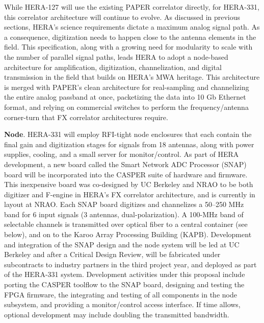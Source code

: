 \documentclass[preprint]{aastex}
\begin{document}
While HERA-127 will use the existing PAPER correlator directly, for
HERA-331, this correlator architecture will continue to evolve.  As discussed in previous sections,
HERA's science requirements dictate a maximum analog signal path.  As a consequence,
digitization needs to happen close to the antenna
elements in the field.  This specification, along with a growing need for modularity to scale with the number of parallel signal paths,
leads HERA to adopt a node-based architecture for amplification, digitization, channelization, and digital
transmission in the field that builds on HERA's MWA heritage.  This architecture is merged with PAPER's clean 
architecture for real-sampling and channelizing the entire analog passband at once, packetizing the data into
10 Gb Ethernet format, and relying on commercial switches to perform the frequency/antenna corner-turn that
FX correlator architectures require. 



\noindent
{\bf Node}. HERA-331 will employ RFI-tight node enclosures that each contain the final gain and digitization stages for
signals from 18 antennas, along with power supplies, cooling, and a small server for monitor/control.  
As part of HERA development,
a new board called the Smart Network ADC Processor (SNAP) board will be incorporated 
into the CASPER suite of hardware and firmware. This inexpensive board was co-designed by UC Berkeley and NRAO to be
both digitizer and F-engine in HERA's FX correlator architecture,
and is currently in layout at NRAO.  Each SNAP board 
digitizes and channelizes a 50--250 MHz band for 6 input signals (3 antennas, dual-polarization).
A 100-MHz band of selectable channels is transmitted over optical fiber
to a central container (see below), and on to the Karoo Array Processing Building (KAPB).  Development and integration of the SNAP
design and the node system will be led at UC Berkeley and after a Critical Design Review, will be fabricated
under subcontracts to industry partners in the third project year, and deployed as part of the HERA-331 system.
Development activities under this proposal include porting the CASPER toolflow to
the SNAP board, designing and testing the FPGA firmware,
the integrating and testing of all components in the node subsystem, and providing a monitor/control
access interface.  If time allows, optional development may include doubling the transmitted bandwidth.
\end{document}

